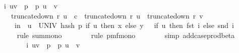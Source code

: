 \begin{isabellebody}
\ {\isachardoublequoteopen}{\isachardot}{\kern0pt}{\isachardot}{\kern0pt}{\isachardot}{\kern0pt}\ {\isasymle}\ {\isacharparenleft}{\kern0pt}{\isasymSum}\ i{\isasymin}\ {\isacharbraceleft}{\kern0pt}{\isacharparenleft}{\kern0pt}u{\isacharcomma}{\kern0pt}v{\isacharparenright}{\kern0pt}\ {\isasymin}\ {\isacharbraceleft}{\kern0pt}{}{\isachardot}{\kern0pt}{\isachardot}{\kern0pt}{\isacharless}{\kern0pt}p{\isacharbraceright}{\kern0pt}\ {\isasymtimes}\ {\isacharbraceleft}{\kern0pt}{}{\isachardot}{\kern0pt}{\isachardot}{\kern0pt}{\isacharless}{\kern0pt}p{\isacharbraceright}{\kern0pt}{\isachardot}{\kern0pt}\ u\ {\isasymnoteq}\ v\ {\isasymand}\isanewline
\ \ \ \ \ \ truncate{\isacharunderscore}{\kern0pt}down\ r\ u\ {\isasymle}\ c\ {\isasymand}\ truncate{\isacharunderscore}{\kern0pt}down\ r\ u\ {\isacharequal}{\kern0pt}\ truncate{\isacharunderscore}{\kern0pt}down\ r\ v{\isacharbraceright}{\kern0pt}{\isachardot}{\kern0pt}\ \isanewline
\ \ \ \ \ \ {\isasymP}{\isacharparenleft}{\kern0pt}{\isasymomega}\ in\ {\isasymOmega}{\isachardot}{\kern0pt}\ {\isacharparenleft}{\kern0pt}{\isasymforall}u\ {\isasymin}\ UNIV{\isachardot}{\kern0pt}\ hash\ p\ {\isacharparenleft}{\kern0pt}if\ u\ then\ x\ else\ y{\isacharparenright}{\kern0pt}\ {\isasymomega}\ {\isacharequal}{\kern0pt}\ {\isacharparenleft}{\kern0pt}if\ u\ then\ {\isacharparenleft}{\kern0pt}fst\ i{\isacharparenright}{\kern0pt}\ else\ {\isacharparenleft}{\kern0pt}snd\ i{\isacharparenright}{\kern0pt}{\isacharparenright}{\kern0pt}{\isacharparenright}{\kern0pt}{\isacharparenright}{\kern0pt}{\isacharparenright}{\kern0pt}{\isachardoublequoteclose}\ \isanewline
\ \ \ \ \ \ \isamarkupfalse%
\ {\isacharparenleft}{\kern0pt}rule\ sum{\isacharunderscore}{\kern0pt}mono{\isacharparenright}{\kern0pt}\isanewline
\ \ \ \ \ \ \isamarkupfalse%
\ {\isacharparenleft}{\kern0pt}rule\ pmf{\isacharunderscore}{\kern0pt}mono{\isacharparenright}{\kern0pt}\isanewline
\ \ \ \ \ \ \isamarkupfalse%
\ {\isacharparenleft}{\kern0pt}simp\ add{\isacharcolon}{\kern0pt}case{\isacharunderscore}{\kern0pt}prod{\isacharunderscore}{\kern0pt}beta{\isacharparenright}{\kern0pt}\isanewline
\ \ \ \ \isamarkupfalse%
\ \isamarkupfalse%
\ {\isachardoublequoteopen}{\isachardot}{\kern0pt}{\isachardot}{\kern0pt}{\isachardot}{\kern0pt}\ {\isasymle}\ {\isacharparenleft}{\kern0pt}{\isasymSum}\ i{\isasymin}\ {\isacharbraceleft}{\kern0pt}{\isacharparenleft}{\kern0pt}u{\isacharcomma}{\kern0pt}v{\isacharparenright}{\kern0pt}\ {\isasymin}\ {\isacharbraceleft}{\kern0pt}{}{\isachardot}{\kern0pt}{\isachardot}{\kern0pt}{\isacharless}{\kern0pt}p{\isacharbraceright}{\kern0pt}\ {\isasymtimes}\ {\isacharbraceleft}{\kern0pt}{}{\isachardot}{\kern0pt}{\isachardot}{\kern0pt}{\isacharless}{\kern0pt}p{\isacharbraceright}{\kern0pt}{\isachardot}{\kern0pt}\ u\ {\isasymnoteq}\ v\ {\isasymand}\isanewline

\end{isabellebody}
